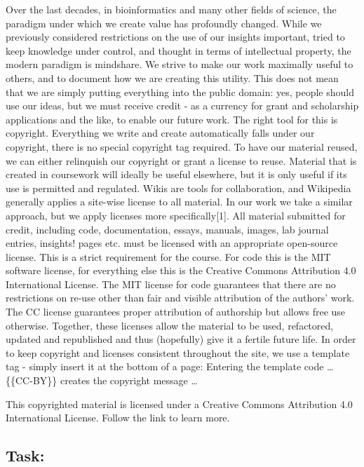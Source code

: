 \documentclass[]{book}
\begin{document}
Over the last decades, in bioinformatics and many other fields of
science, the paradigm under which we create value has profoundly
changed. While we previously considered restrictions on the use of our
insights important, tried to keep knowledge under control, and thought
in terms of intellectual property, the modern paradigm is mindshare. We
strive to make our work maximally useful to others, and to document how
we are creating this utility. This does not mean that we are simply
putting everything into the public domain: yes, people should use our
ideas, but we must receive credit - as a currency for grant and
scholarship applications and the like, to enable our future work. The
right tool for this is copyright. Everything we write and create
automatically falls under our copyright, there is no special copyright
tag required. To have our material reused, we can either relinquish our
copyright or grant a license to reuse. Material that is created in
coursework will ideally be useful elsewhere, but it is only useful if
its use is permitted and regulated. Wikis are tools for collaboration,
and Wikipedia generally applies a site-wise license to all material. In
our work we take a similar approach, but we apply licenses more
specifically{[}1{]}. All material submitted for credit, including code,
documentation, essays, manuals, images, lab journal entries, insights!
pages etc. must be licensed with an appropriate open-source license.
This is a strict requirement for the course. For code this is the MIT
software license, for everything else this is the Creative Commons
Attribution 4.0 International License. The MIT license for code
guarantees that there are no restrictions on re-use other than fair and
visible attribution of the authors' work. The CC license guarantees
proper attribution of authorship but allows free use otherwise.
Together, these licenses allow the material to be used, refactored,
updated and republished and thus (hopefully) give it a fertile future
life. In order to keep copyright and licenses consistent throughout the
site, we use a template tag - simply insert it at the bottom of a page:
Entering the template code \ldots{} \{\{CC-BY\}\} creates the copyright
message \ldots{}

This copyrighted material is licensed under a Creative Commons
Attribution 4.0 International License. Follow the link to learn more.

\subsection{Task:}\label{task-1}
\end{document}
